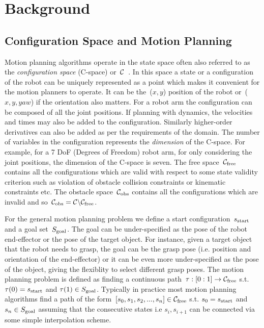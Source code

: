 \documentclass[a4paper]{report}
\begin{document}
\newpage
\chapter{Background}
\section{Configuration Space and Motion Planning}
Motion planning algorithms operate in the state space often also referred to as the \emph{configuration space} (C-space) or~$\mathcal{C}$~\cite{lozano1990spatial}. In this space a state or a configuration of the robot can be uniquely represented as a point which makes it convenient for the motion planners to operate. It can be the~($x,y$) position of the robot or~($x,y,yaw$) if the orientation also matters. For a robot arm the configuration can be composed of all the joint positions. If planning with dynamics, the velocities and times may also be added to the configuration. Similarly higher-order derivatives can also be added as per the requirements of the domain. The number of variables in the configuration represents the \emph{dimension} of the C-space. For example, for a 7 DoF (Degrees of Freedom) robot arm, for only considering the joint positions, the dimension of the C-space is seven. The free space~$\mathcal{C}_{\rm free}$ contains all the configurations which are valid with respect to some state validity criterion such as violation of obstacle collision constraints or kinematic constraints etc. The obstacle space~$\mathcal{C}_{\rm obs}$ contains all the configurations which are invalid and so~$\mathcal{C}_{\rm obs} = \mathcal{C} \backslash \mathcal{C}_{\rm free}$.

For the general motion planning problem we define a start configuration~$s_{\textrm{start}}$ and a goal set~$S_{\rm goal}$. The goal can be under-specified as the pose of the robot end-effector or the pose of the target object. For instance, given a target object that the robot needs to grasp, the goal can be the grasp pose (i.e. position and orientation of the end-effector) or it can be even more under-specified as the pose of the object, giving the flexiblity to select different grasp poses. The motion planning problem is defined as finding a continuous path~$\tau : [0:1] \rightarrow \mathcal{C}_{\rm free}$ s.t. $\tau(0) = s_{\textrm{start}}$ and $\tau(1) \in S_{\rm goal} $. Typically in practice most motion planning algorithms find a path of the form~$[s_0, s_1, s_2,...,s_n] \in \mathcal{C}_{\rm free}$ s.t. $s_0 = s_{\textrm{start}}$ and $s_n \in S_{\rm goal}$ assuming that the consecutive states i.e $s_i, s_{i+1}$ can be connected via some simple interpolation scheme.
\end{document}
